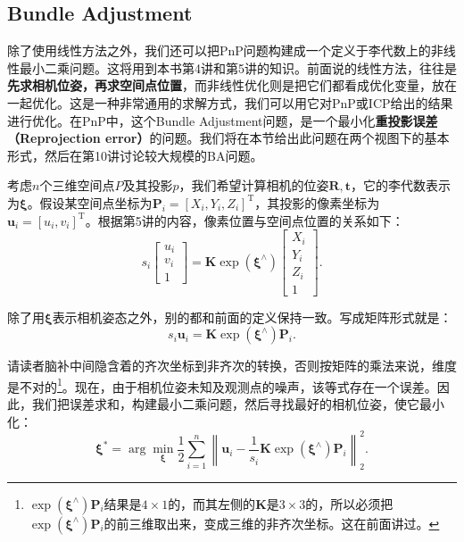 \subsection{Bundle Adjustment}
\label{sec:BA-vo1}

除了使用线性方法之外，我们还可以把PnP问题构建成一个定义于李代数上的非线性最小二乘问题。这将用到本书第4讲和第5讲的知识。前面说的线性方法，往往是\textbf{先求相机位姿，再求空间点位置}，而非线性优化则是把它们都看成优化变量，放在一起优化。这是一种非常通用的求解方式，我们可以用它对PnP或ICP给出的结果进行优化。在PnP中，这个Bundle Adjustment问题，是一个最小化\textbf{重投影误差（Reprojection error）}的问题。我们将在本节给出此问题在两个视图下的基本形式，然后在第10讲讨论较大规模的BA问题。

考虑$n$个三维空间点$P$及其投影$p$，我们希望计算相机的位姿$\bm{R}, \bm{t}$，它的李代数表示为$\bm{\xi}$。假设某空间点坐标为$\bm{P}_i=[X_i,Y_i,Z_i]^\mathrm{T}$，其投影的像素坐标为$\bm{u}_i=[u_i,v_i]^\mathrm{T}$。根据第5讲的内容，像素位置与空间点位置的关系如下：
\begin{equation}
s_i \left[ 
\begin{array}{l}
u_i \\ v_i \\ 1
\end{array}
\right] = \bm{K} \exp \left( {{\bm{\xi} ^ \wedge }} \right)\left[ 
\begin{array}{l}
X_i \\ Y_i \\ Z_i \\ 1
\end{array} \right]  .
\end{equation}

除了用$\bm{\xi}$表示相机姿态之外，别的都和前面的定义保持一致。写成矩阵形式就是：
\[
{{s_i {\bm{u}}_i} = \bm{K}\exp \left( {{\bm{\xi} ^ \wedge }} \right){{\bm{P}}_i}}.
\]

请读者脑补中间隐含着的齐次坐标到非齐次的转换，否则按矩阵的乘法来说，维度是不对的\footnote{ $ \exp \left( {{\bm{\xi} ^ \wedge }} \right){\bm{P}_i}$结果是$4 \times 1$的，而其左侧的$\bm{K}$是$3 \times 3$的，所以必须把$\exp \left( {{\bm{\xi} ^ \wedge }} \right){{\bm{P}}_i}$的前三维取出来，变成三维的非齐次坐标。这在前面讲过。}。现在，由于相机位姿未知及观测点的噪声，该等式存在一个误差。因此，我们把误差求和，构建最小二乘问题，然后寻找最好的相机位姿，使它最小化：
\begin{equation}
{\bm{\xi} ^*} = \arg \mathop {\min }\limits_{\bm{\xi}}  \frac{1}{2}\sum\limits_{i = 1}^n {\left\| {{{\bm{u}}_i} - \frac{1}{s_i} \bm{K}\exp \left( {{\bm{\xi} ^ \wedge }} \right){{\bm{P}}_i}} \right\|_2^2} .
\end{equation}

